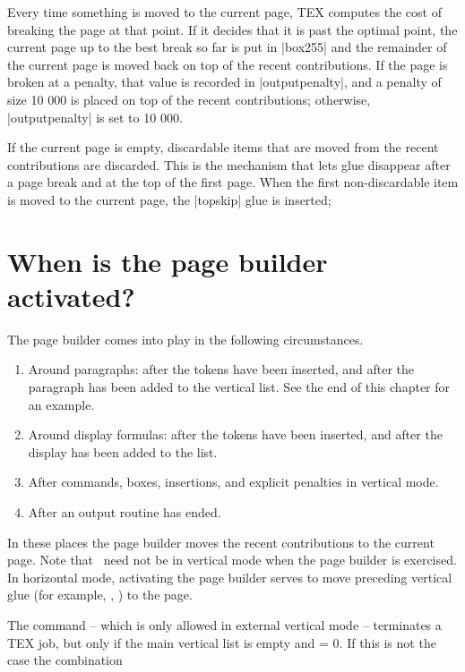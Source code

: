 Every time something is moved to the current page, TEX computes the cost of breaking the
page at that point. If it decides that it is past the optimal point, the current page up to the
best break so far is put in |box255| and the remainder of the current page is moved back
on top of the recent contributions. If the page is broken at a penalty, that value is recorded
in |outputpenalty|, and a penalty of size 10 000 is placed on top of the recent contributions;
otherwise, |outputpenalty| is set to 10 000.

If the current page is empty, discardable items that are moved from the recent contributions
are discarded. This is the mechanism that lets glue disappear after a page break and at the
top of the first page. When the first non-discardable item is moved to the current page, the
|topskip| glue is inserted; 


\section{When is the page builder activated?}

The page builder comes into play in the following circumstances.

\begin{enumerate}
\item  Around paragraphs: after the  tokens have been inserted, and after the
paragraph has been added to the vertical list. See the end of this chapter for an
example.

\item  Around display formulas: after the  tokens have been inserted, and after
the display has been added to the list.

\item  After  commands, boxes, insertions, and explicit penalties in vertical mode.

\item  After an output routine has ended.
\end{enumerate}

In these places the page builder moves the recent contributions to the current page. Note that
\tex\  need not be in vertical mode when the page builder is exercised. In horizontal mode,
activating the page builder serves to move preceding vertical glue (for example, ,
) to the page.

The  command – which is only allowed in external vertical mode – terminates a TEX job,
but only if the main vertical list is empty and  = 0. If this is not the case the
combination



